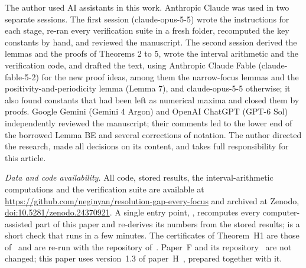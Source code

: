 \begin{acknowledgments}
The author used AI assistants in this work. Anthropic Claude was used in two separate sessions. The first session (claude-opus-5-5) wrote the instructions for each stage, re-ran every verification suite in a fresh folder, recomputed the key constants by hand, and reviewed the manuscript. The second session derived the lemmas and the proofs of Theorems 2 to 5, wrote the interval arithmetic and the verification code, and drafted the text, using Anthropic Claude Fable (claude-fable-5-2) for the new proof ideas, among them the narrow-focus lemmas and the positivity-and-periodicity lemma (Lemma 7), and claude-opus-5-5 otherwise; it also found constants that had been left as numerical maxima and closed them by proofs. Google Gemini (Gemini 4 Argon) and OpenAI ChatGPT (GPT-6 Sol) independently reviewed the manuscript; their comments led to the lower end of the borrowed Lemma BE and several corrections of notation.
The author directed the research, made all decisions on its content, and takes full responsibility for this article.
\end{acknowledgments}

\emph{Data and code availability.}
All code, stored results, the interval-arithmetic computations and the verification suite are available at \url{https://github.com/neginyan/resolution-gap-every-focus} and archived at Zenodo, \href{https://doi.org/10.5281/zenodo.24370921}{doi:10.5281/zenodo.24370921}.
A single entry point, , recomputes every computer-assisted part of this paper and re-derives its numbers from the stored results;  is a short check that runs in a few minutes.
The certificates of Theorem~H1 are those of~\cite{H} and are re-run with the repository of~\cite{H}.
Paper~F and its repository~\cite{F} are not changed; this paper uses version~1.3 of paper~H~\cite{H}, prepared together with it.
